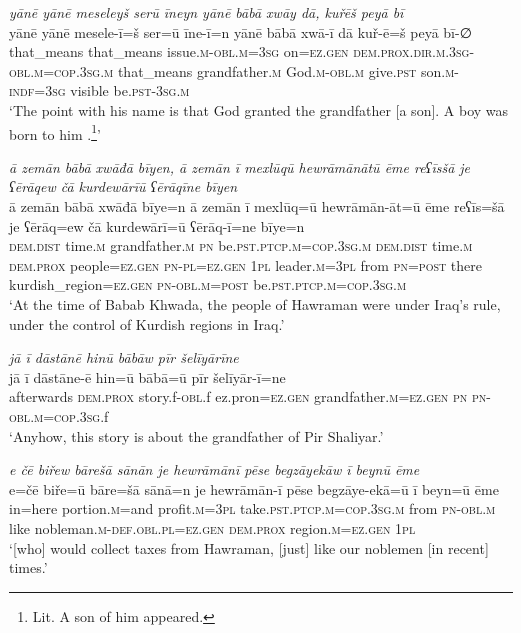 \ea \label{BP.3}
\textit{yānē yānē meseleyš serū īneyn yānē bābā xwāy dā, kuřēš peyā bī} \\ 
\gll yānē yānē mesele-ī=š ser=ū īne-ī=n yānē bābā xwā-ī dā kuř-ē=š peyā bī-∅ \\ 
 that\_means that\_means issue\textsc{.m}\textsc{-obl}\textsc{.m}\textsc{=3sg} on\textsc{=ez.gen} \textsc{dem.prox}\textsc{.dir}\textsc{.m}\textsc{.3sg}\textsc{-obl}\textsc{.m}\textsc{=cop}\textsc{.3sg}\textsc{.m} that\_means grandfather\textsc{.m} God\textsc{.m}\textsc{-obl}\textsc{.m} give\textsc{.pst} son\textsc{.m}\textsc{-indf}\textsc{=3sg} visible be\textsc{.pst}\textsc{-3sg}\textsc{.m} \\ 
\glt `The point with his name is that God granted the grandfather [a son]. A boy  was born to him .\footnote{Lit. A son of him appeared.}'
\z 
 
\ea \label{BP.9}
\textit{ā zemān bābā xwāđā bīyen, ā zemān ī mexlūqū hewrāmānātū ēme reʕīsšā je ʕērāqew čā kurdewārīū ʕērāqīne bīyen} \\ 
\gll ā zemān bābā xwāđā bīye=n ā zemān ī mexlūq=ū hewrāmān-āt=ū ēme reʕīs=šā je ʕērāq=ew čā kurdewārī=ū ʕērāq-ī=ne bīye=n \\ 
 \textsc{dem.dist} time\textsc{.m} grandfather\textsc{.m} \textsc{pn} be\textsc{.pst}\textsc{.ptcp}\textsc{.m}\textsc{=cop}\textsc{.3sg}\textsc{.m} \textsc{dem.dist} time\textsc{.m} \textsc{dem.prox} people\textsc{=ez.gen} \textsc{pn}\textsc{\textsc{-pl}}\textsc{=ez.gen} \textsc{1pl} leader\textsc{.m}\textsc{=3pl} from \textsc{pn}\textsc{=\textsc{post}} there kurdish\_region\textsc{=ez.gen} \textsc{pn}\textsc{-obl}\textsc{.m}\textsc{=\textsc{post}} be\textsc{.pst}\textsc{.ptcp}\textsc{.m}\textsc{=cop}\textsc{.3sg}\textsc{.m} \\ 
\glt `At the time of Babab Khwada, the people of Hawraman were under Iraq’s rule, under the control of Kurdish regions in Iraq.'
\z 
 
\ea \label{BP.20}
\textit{jā ī dāstānē hinū bābāw pīr šelīyārīne} \\ 
\gll jā ī dāstāne-ē hin=ū bābā=ū pīr šelīyār-ī=ne \\ 
 afterwards \textsc{dem.prox} story.f\textsc{-obl}.f ez.pron\textsc{=ez.gen} grandfather\textsc{.m}\textsc{=ez.gen} \textsc{pn} \textsc{pn}\textsc{-obl}\textsc{.m}\textsc{=cop}\textsc{.3sg}.f \\ 
\glt `Anyhow, this story is about the grandfather of Pir Shaliyar.'
\z 
 
\ea \label{BP.24}
\textit{e čē biřew bārešā sānān je hewrāmānī pēse begzāyekāw ī beynū ēme} \\ 
\gll e=čē biře=ū bāre=šā sānā=n je hewrāmān-ī pēse begzāye-ekā=ū ī beyn=ū ēme \\ 
 in=here portion\textsc{.m}=and profit\textsc{.m}\textsc{=3pl} take\textsc{.pst}\textsc{.ptcp}\textsc{.m}\textsc{=cop}\textsc{.3sg}\textsc{.m} from \textsc{pn}\textsc{-obl}\textsc{.m} like nobleman\textsc{.m}\textsc{-def}\textsc{.obl}\textsc{.pl}\textsc{=ez.gen} \textsc{dem.prox} region\textsc{.m}\textsc{=ez.gen} \textsc{1pl} \\ 
\glt `[who] would collect taxes from Hawraman, [just] like our noblemen [in recent] times.'
\z 
 
